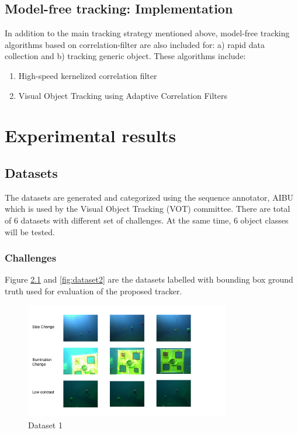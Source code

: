 \documentclass[fypca]{socreport}
\begin{document}
\section{Model-free tracking: Implementation}

In addition to the main tracking strategy mentioned above, model-free tracking algorithms
based on correlation-filter are also included for: a) rapid data collection and
b) tracking generic object. These algorithms include:

\begin{enumerate}
  \item High-speed kernelized correlation filter 
  \item Visual Object Tracking using Adaptive Correlation Filters 
\end{enumerate}


\chapter{Experimental results}

\section{Datasets}

The datasets are generated and categorized using the sequence annotator, AIBU
which is used by the Visual Object Tracking (VOT) committee. There are total of
6 datasets with different set of challenges. At the same time, 6 object classes
will be tested.

\subsection{Challenges}

Figure \ref{fig:dataset1} and \ref{fig:dataset2} are the datasets labelled with
bounding box ground truth used for evaluation of the proposed tracker.

\begin{figure}[H]
\centering
  \includegraphics[width=0.8\textwidth, height=0.3\textheight]{data1.png}
  \caption{Dataset 1}
  \label{fig:dataset1}
\end{figure}
\end{document}
